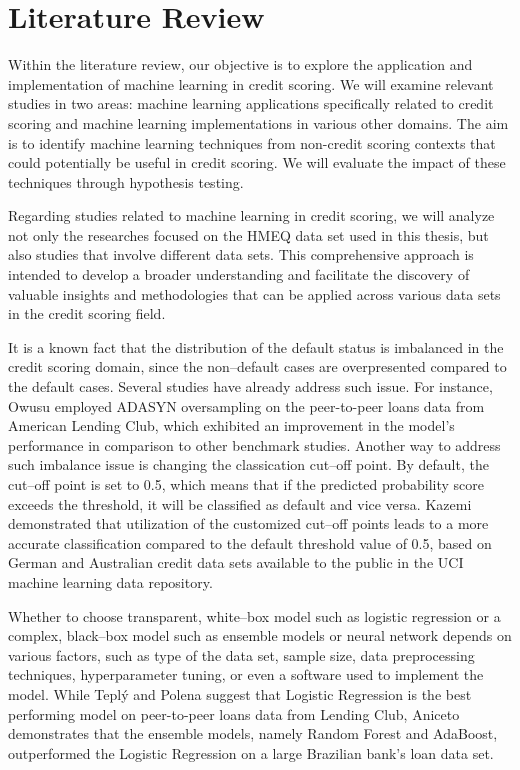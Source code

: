 \chapter{Literature Review}
\label{chap:three}

Within the literature review, our objective is to explore the application and implementation of machine learning in credit scoring.
We will examine relevant studies in two areas: machine learning applications specifically related to credit scoring and machine learning implementations in various other domains. The aim is to identify machine learning techniques from non-credit scoring contexts that could potentially be useful in credit scoring. We will evaluate the impact of these techniques through hypothesis testing.

Regarding studies related to machine learning in credit scoring, we will analyze not only the researches focused on the HMEQ data set used in this thesis, but also studies that involve different data sets. This comprehensive approach is intended to develop a broader understanding and facilitate the discovery of valuable insights and methodologies that can be applied across various data sets in the credit scoring field.

It is a known fact that the distribution of the default status is imbalanced in the credit scoring domain, since the non--default cases are overpresented compared to the default cases. Several studies have already address such issue.
For instance, Owusu \citep{owusu2023deep} employed ADASYN oversampling on the peer-to-peer loans data from American Lending Club, which exhibited an improvement in the model's performance in comparison to other benchmark studies.
Another way to address such imbalance issue is changing the classication cut--off point.
By default, the cut--off point is set to 0.5, which means that if the predicted probability score exceeds the threshold, it will be classified as default and vice versa. Kazemi \citep{kazemi2023estimation} demonstrated that utilization of the customized cut--off points leads to a more accurate classification compared to the default threshold value of 0.5, based on German and Australian credit data sets available to the public in the UCI machine learning data repository.


Whether to choose transparent, white--box model such as logistic regression or a complex, black--box model such as ensemble models or neural network depends on various factors, such as type of the data set, sample size, data preprocessing techniques, hyperparameter tuning, or even a software used to implement the model.
While Tepl\'{y} and Polena \citep{teply2020best} suggest that Logistic Regression is the best performing model on peer-to-peer loans data from Lending Club, Aniceto  \citep{aniceto2020machine} demonstrates that the ensemble models, namely Random Forest and AdaBoost, outperformed the Logistic Regression on a large Brazilian bank's loan data set.


